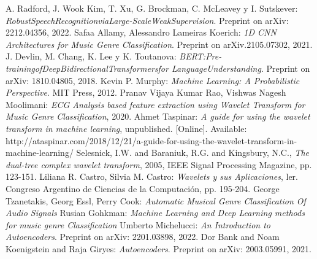 \documentclass[colorinlistoftodos,twoside,twocolumn,10pt]{article} %
\begin{document}
	    
	\begin{thebibliography}{20}
		 A. Radford, J. Wook Kim, T. Xu, G. Brockman, C. McLeavey y I. Sutskever: \emph{RobustSpeechRecognitionviaLarge-ScaleWeakSupervision}. Preprint on arXiv: 2212.04356, 2022. 	
		 Safaa Allamy, Alessandro Lameiras Koerich: \emph{1D CNN Architectures for Music Genre Classification}. Preprint on arXiv.2105.07302, 2021. 
		 J. Devlin, M. Chang, K. Lee y K. Toutanova: \emph{BERT:Pre-trainingofDeepBidirectionalTransformersfor LanguageUnderstanding}. Preprint on arXiv: 1810.04805, 2018. 
		 Kevin P. Murphy: \emph{Machine Learning: A Probabilistic Perspective}. MIT Press, 2012.
		 Pranav Vijaya Kumar Rao, Vishwas Nagesh Moolimani: \emph{ECG Analysis based feature extraction using Wavelet Transform for Music Genre Classification}, 2020. 
		 Ahmet Taspinar: \emph{A guide for using the wavelet transform in machine learning}, unpublished. [Online]. Available: http://ataspinar.com/2018/12/21/a-guide-for-using-the-wavelet-transform-in-machine-learning/
		 Selesnick, I.W. and Baraniuk, R.G. and Kingsbury, N.C., \emph{The dual-tree complex wavelet transform}, 2005, IEEE Signal Processing Magazine, pp. 123-151.
		 Liliana R. Castro, Silvia M.  Castro: \emph{Wavelets y sus Aplicaciones}, ler. Congreso Argentino de Ciencias de la Computaci\'on, pp. 195-204.
		 George Tzanetakis, Georg Essl, Perry Cook: \emph{Automatic Musical Genre Classification Of Audio Signals}
		 Rusian Gohkman: \emph{Machine Learning and Deep Learning methods for music genre Classification}
		 Umberto Michelucci: \emph{An Introduction to Autoencoders}. Preprint on arXiv: 2201.03898, 2022.
		 Dor Bank and Noam Koenigstein and Raja Giryes: \emph{Autoencoders}. Preprint on arXiv: 2003.05991, 2021.
    \end{thebibliography}
	
\end{document}
